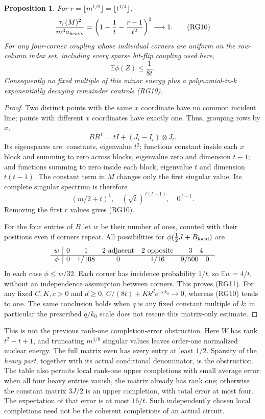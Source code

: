 \documentclass[11pt]{article}
\newtheorem{proposition}{Proposition}
\newcommand{\E}{\mathbb E}
\begin{document}
\begin{proposition}
For $r=\lfloor m^{1/8}\rfloor=\lfloor t^{1/4}\rfloor$,
\[
 \frac{\tau_r(M)^2}{m^3a_{\rm heavy}}
       =\left(1-\frac1t-\frac{r-1}{t^2}\right)^2
       \longrightarrow1.                                    \tag{RG10}
\]
For \emph{any} four-corner coupling whose individual corners are
uniform on the row-column index set, including every sparse bit-flip
coupling used here,
\[
                       \E\phi(Z)\le\frac1{8t}.                \tag{RG11}
\]
Consequently no fixed multiple of this minor energy plus a
polynomial-in-$k$ exponentially decaying remainder controls (RG10).
\end{proposition}
\begin{proof}
Two distinct points with the same $x$ coordinate have no common
incident line; points with different $x$ coordinates have exactly one.
Thus, grouping rows by $x$,
\[
 BB^{\mathsf T}=tI+(J_t-I_t)\otimes J_t.
\]
Its eigenspaces are: constants, eigenvalue $t^2$; functions constant
inside each $x$ block and summing to zero across blocks, eigenvalue
zero and dimension $t-1$; and functions summing to zero inside
each block, eigenvalue $t$ and dimension $t(t-1)$.
The constant term in $M$ changes only the first singular value.
Its complete singular spectrum is therefore
\[
             (m/2+t)^1,\quad(\sqrt t)^{\,t(t-1)},\quad0^{\,t-1}.
                                                               \tag{RG12}
\]
Removing the first $r$ values gives (RG10).

For the four entries of $B$ let $w$ be their number of ones,
counted with their positions even if corners repeat.
All possibilities for $\phi(\tfrac12J+B_{\rm local})$ are
\[
\begin{array}{c|ccccc}
w&0&1&2\ {\rm adjacent}&2\ {\rm opposite}&3\quad 4\\ \hline
\phi&0&1/108&0&1/16&9/500\quad 0 .
\end{array}
\]
In each case $\phi\le w/32$. Each corner has incidence probability
$1/t$, so $\E w=4/t$, without an independence assumption between
corners. This proves (RG11). For any fixed $C,K,c>0$ and $d\ge0$,
$C/(8t)+Kk^d e^{-ck_0}\to0$, whereas (RG10) tends to one.
The same conclusion holds when $q$ is any fixed constant multiple
of $k$; in particular the prescribed $q/k_0$ scale does not rescue
this matrix-only estimate.
\end{proof}

This is not the previous rank-one completion-error obstruction.
Here $W$ has rank $t^2-t+1$, and truncating $m^{1/8}$ singular values
leaves order-one normalized nuclear energy. The full matrix even has
every entry at least $1/2$. Sparsity of the \emph{heavy part}, together
with its actual conditional denominator, is the obstruction.
The table also permits local rank-one upper completions with small
average error: when all four heavy entries vanish, the matrix already
has rank one; otherwise the constant matrix $3J/2$ is an upper
completion, with total error at most four. The expectation of that
error is at most $16/t$. Such independently chosen local completions
need not be the coherent completions of an actual circuit.
\end{document}
